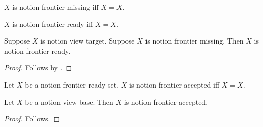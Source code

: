 

\begin{definition}\label{notion_frontier_missing}
    $X$ is notion frontier missing iff $X=X$.
\end{definition}

\begin{definition}\label{notion_frontier_ready}
    $X$ is notion frontier ready iff $X=X$.
\end{definition}

\begin{classification}\label{notion_frontier_ready_intro}
    Suppose $X$ is notion view target.
    Suppose $X$ is notion frontier missing.
    Then $X$ is notion frontier ready.
\end{classification}
\begin{proof}
    Follows by .
\end{proof}

\begin{definition}\label{notion_frontier_accepted}
    Let $X$ be a notion frontier ready set.
    $X$ is notion frontier accepted iff $X=X$.
\end{definition}

\begin{proposition}\label{notion_frontier_ranked_failure}
    Let $X$ be a notion view base.
    Then $X$ is notion frontier accepted.
\end{proposition}
\begin{proof}
    Follows.
\end{proof}
